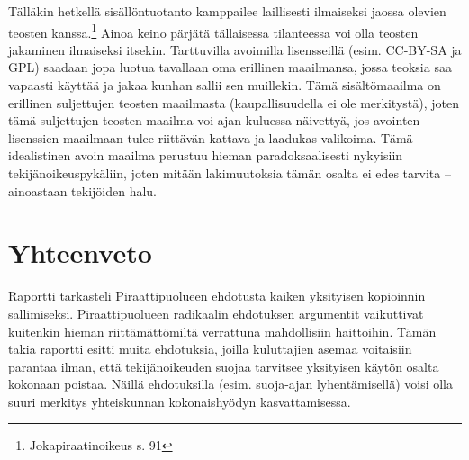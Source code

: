 \documentclass[titlepage,12pt]{article}
\begin{document}
Tälläkin hetkellä sisällöntuotanto kamppailee laillisesti ilmaiseksi
jaossa olevien teosten kanssa.\footnote{Jokapiraatinoikeus s. 91}
Ainoa keino pärjätä tällaisessa tilanteessa voi olla teosten jakaminen
ilmaiseksi itsekin.  Tarttuvilla avoimilla lisensseillä
(esim. CC-BY-SA ja GPL) saadaan jopa luotua tavallaan oma erillinen
maailmansa, jossa teoksia saa vapaasti käyttää ja jakaa kunhan sallii
sen muillekin.  Tämä sisältömaailma on erillinen suljettujen teosten
maailmasta (kaupallisuudella ei ole merkitystä), joten tämä
suljettujen teosten maailma voi ajan kuluessa näivettyä, jos avointen
lisenssien maailmaan tulee riittävän kattava ja laadukas valikoima.
Tämä idealistinen avoin maailma perustuu hieman paradoksaalisesti
nykyisiin tekijänoikeuspykäliin, joten mitään lakimuutoksia tämän
osalta ei edes tarvita -- ainoastaan tekijöiden halu.





\section{Yhteenveto}

Raportti tarkasteli Piraattipuolueen ehdotusta kaiken yksityisen
kopioinnin sallimiseksi.  Piraattipuolueen radikaalin ehdotuksen
argumentit vaikuttivat kuitenkin hieman riittämättömiltä verrattuna
mahdollisiin haittoihin.  Tämän takia raportti esitti muita
ehdotuksia, joilla kuluttajien asemaa voitaisiin parantaa ilman, että
tekijänoikeuden suojaa tarvitsee yksityisen käytön osalta kokonaan
poistaa.  Näillä ehdotuksilla (esim. suoja-ajan lyhentämisellä) voisi
olla suuri merkitys yhteiskunnan kokonaishyödyn kasvattamisessa.



\pagebreak


  

    
\end{document}
